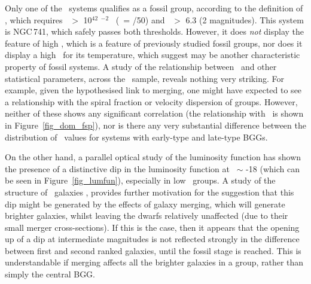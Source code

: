 \documentclass[usenatbib]{mn2e}
\begin{document}
Only one of the \GEMS\ systems qualifies as a fossil group, according to the
definition of \citet{jones03}, which requires \LX\ $>$ 10$^{42}$ \hfifty$^{-2}$
\ergps\ (\hfifty\ = \Hzero/50) and \dom\ $>$ 6.3 (2 magnitudes).  This system is
NGC\,741, which safely passes both thresholds.  However, it does {\it not}
display the feature of high \LXpLB, which is a feature of previously studied
fossil groups, nor does it display a high \LX\ for its temperature, which
\citet{jones03} suggest may be another characteristic property of fossil systems.
A study of the relationship between \dom\ and other statistical parameters,
across the \GEMS\ sample, reveals nothing very striking. For example, given the
hypothesised link to merging, one might have expected to see a relationship with
the spiral fraction or velocity dispersion of groups.  However, neither of these
shows any significant correlation (the relationship with \fsp\ is shown in
Figure~\ref{fig_dom_fsp}), nor is there any very substantial difference between
the distribution of \dom\ values for systems with early-type and late-type BGGs.

On the other hand, a parallel optical study of the luminosity function
\citep{miles04} has shown the presence of a distinctive dip in the luminosity
function at \MB\ $\sim$ -18 (which can be seen in Figure~\ref{fig_lumfun}),
especially in low \LX\ groups.  A study of the structure of \GEMS\ galaxies
\citep{khosroshahi04a}, provides further motivation for the suggestion that this
dip might be generated by the effects of galaxy merging, which will generate
brighter galaxies, whilst leaving the dwarfs relatively unaffected (due to their
small merger cross-sections).  If this is the case, then it appears that the
opening up of a dip at intermediate magnitudes is not reflected strongly in the
difference between first and second ranked galaxies, until the fossil stage is
reached.  This is understandable if merging affects all the brighter galaxies in
a group, rather than simply the central BGG.
\end{document}
